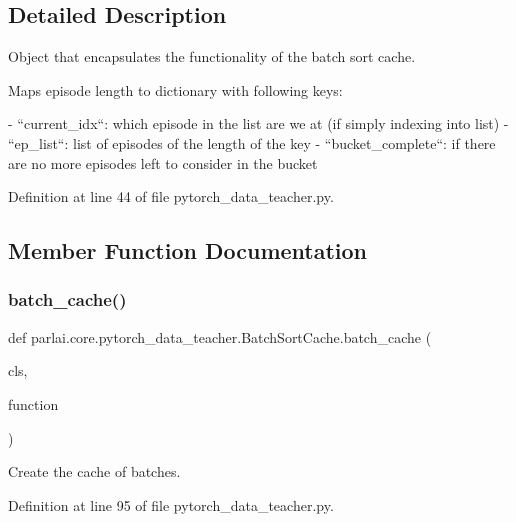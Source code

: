 \subsection{Detailed Description}
\begin{DoxyVerb}Object that encapsulates the functionality of the batch sort cache.

Maps episode length to dictionary with following keys:

- ``current_idx``: which episode in the list are we at (if simply indexing
  into list)
- ``ep_list``: list of episodes of the length of the key
- ``bucket_complete``: if there are no more episodes left to consider in the
  bucket
\end{DoxyVerb}
 

Definition at line 44 of file pytorch\+\_\+data\+\_\+teacher.\+py.



\subsection{Member Function Documentation}
\mbox{\label{classparlai_1_1core_1_1pytorch__data__teacher_1_1BatchSortCache_ae97120b4fec464f79c7d0d9cd54c101d}} 
\subsubsection{\texorpdfstring{batch\+\_\+cache()}{batch\_cache()}}
{\footnotesize\ttfamily def parlai.\+core.\+pytorch\+\_\+data\+\_\+teacher.\+Batch\+Sort\+Cache.\+batch\+\_\+cache (\begin{DoxyParamCaption}\item[{}]{cls,  }\item[{}]{function }\end{DoxyParamCaption})}

\begin{DoxyVerb}Create the cache of batches.\end{DoxyVerb}
 

Definition at line 95 of file pytorch\+\_\+data\+\_\+teacher.\+py.



